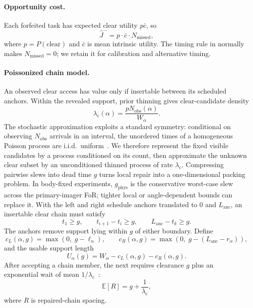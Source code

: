 \paragraph{Opportunity cost.}
Each forfeited task has expected clear utility $p\bar{c}$, so
\begin{equation}
\hat{J}^- = p \cdot \bar{c} \cdot N_{\mathrm{missed}},
\label{eq:opp_cost}
\end{equation}
where $p=P(\text{clear})$ and $\bar{c}$ is mean intrinsic utility. The timing rule in  normally makes $N_{\mathrm{missed}}=0$; we retain it for calibration and alternative timing.

\paragraph{Poissonized chain model.}
An observed clear access has value only if insertable between its scheduled anchors. Within the revealed support, prior thinning gives clear-candidate density
\begin{equation}
\lambda_{\mathrm{c}}(\alpha) = \frac{pN_{\mathrm{obs}}(\alpha)}{W_\alpha}.
\label{eq:clear_density}
\end{equation}
The stochastic approximation exploits a standard symmetry: conditional on observing $N_{\mathrm{obs}}$ arrivals in an interval, the unordered times of a homogeneous Poisson process are i.i.d.\ uniform~\citep{feller_introduction_1991,david_order_2004}.
We therefore represent the fixed visible candidates by a process conditioned on its count, then approximate the unknown clear subset by an unconditioned thinned process of rate $\lambda_{\mathrm{c}}$.
Compressing pairwise slews into dead time $g$ turns local repair into a one-dimensional packing problem.
In body-fixed experiments, $g_{\mathrm{phys}}$ is the conservative worst-case slew across the primary-imager FoR; tighter local or angle-dependent bounds can replace it.
With the left and right schedule anchors translated to $0$ and $L_{\mathrm{anc}}$, an insertable clear chain must satisfy
\begin{equation}
t_1 \geq g,\qquad
t_{i+1}-t_i \geq g,\qquad
L_{\mathrm{anc}}-t_k \geq g.
\label{eq:anchored_chain_constraints}
\end{equation}
The anchors remove support lying within $g$ of either boundary. Define
\begin{equation}
c_L(\alpha,g)=\max(0,\;g-\ell_\alpha),\qquad
c_R(\alpha,g)=\max(0,\;g-(L_{\mathrm{anc}}-r_\alpha)),
\label{eq:support_clearances}
\end{equation}
and the usable support length
\begin{equation}
U_\alpha(g)=W_\alpha-c_L(\alpha,g)-c_R(\alpha,g).
\label{eq:usable_support}
\end{equation}
After accepting a chain member, the next requires clearance $g$ plus an exponential wait of mean $1/\lambda_{\mathrm{c}}$~\citep{feller_probability_1948,pyke_renewal_1958}:
\begin{equation}
\mathbb{E}[R] = g + \frac{1}{\lambda_{\mathrm{c}}},
\label{eq:renewal_spacing}
\end{equation}
where $R$ is repaired-chain spacing.

